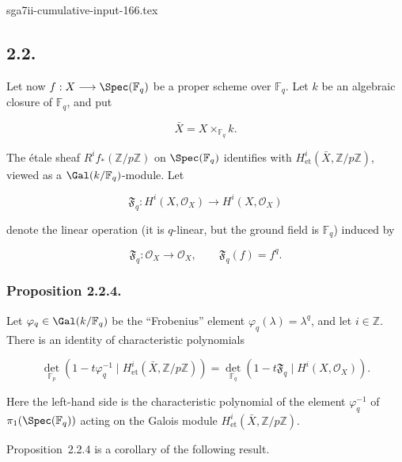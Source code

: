 \begin{filecontents*}{sga7ii-cumulative-input-166.tex}
\subsection*{2.2.}
Let now $f:X\longrightarrow\Spec(\mathbb F_q)$ be a proper scheme over
$\mathbb F_q$. Let $k$ be an algebraic closure of $\mathbb F_q$, and put

\begin{equation}\tag{2.2.1}
\bar X=X\times_{\mathbb F_q}k.
\end{equation}

The étale sheaf $R^if_*(\mathbb Z/p\mathbb Z)$ on
$\Spec(\mathbb F_q)$ identifies with
$H^i_{\mathrm{et}}(\bar X,\mathbb Z/p\mathbb Z)$, viewed as a
$\Gal(k/\mathbb F_q)$-module. Let

\begin{equation}\tag{2.2.2}
\mathfrak F_q:H^i(X,\mathcal O_X)\longrightarrow H^i(X,\mathcal O_X)
\end{equation}

denote the linear operation (it is $q$-linear, but the ground field is
$\mathbb F_q$) induced by

\begin{equation}\tag{2.2.3}
\mathfrak F_q:\mathcal O_X\longrightarrow\mathcal O_X,
\qquad \mathfrak F_q(f)=f^q.
\end{equation}

\subsubsection*{Proposition 2.2.4.}
Let $\varphi_q\in\Gal(k/\mathbb F_q)$ be the ``Frobenius'' element
$\varphi_q(\lambda)=\lambda^q$, and let $i\in\mathbb Z$. There is an
identity of characteristic polynomials

\begin{equation}\tag{2.2.4.1}
\det_{\mathbb F_p}\!\left(
1-t\varphi_q^{-1}\mid H^i_{\mathrm{et}}(\bar X,\mathbb Z/p\mathbb Z)
\right)
=
\det_{\mathbb F_q}\!\left(
1-t\mathfrak F_q\mid H^i(X,\mathcal O_X)
\right).
\end{equation}

Here the left-hand side is the characteristic polynomial of the element
$\varphi_q^{-1}$ of $\pi_1(\Spec(\mathbb F_q))$ acting on the Galois module
$H^i_{\mathrm{et}}(\bar X,\mathbb Z/p\mathbb Z)$.

Proposition~2.2.4 is a corollary of the following result.


\end{filecontents*}
